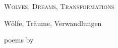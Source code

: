 
\cleartorecto
\thispagestyle{empty}

\vspace*{5em}

{\raggedright

{\Large\chapTitleFont\scshape
Wolves, Dreams, Transformations
\vspace*{0.5\onelineskip}

Wölfe, Träume, Verwandlungen}

\vfill

poems by\\
\theauthor

}
